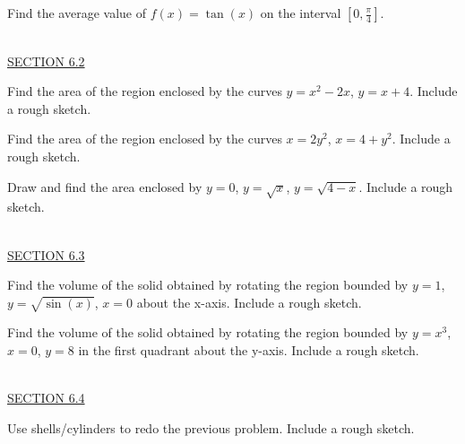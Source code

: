\documentclass{exam}
\begin{document}
\begin{questions}
\question Find the average value of $f(x)=\tan(x)$ on the interval $\left[ 0, \frac{\pi}{4} \right]$.  %



\ \\
\underline{SECTION 6.2}

\question Find the area of the region enclosed by the curves $y=x^2-2x$, $y=x+4$.  Include a rough sketch. %

\question Find the area of the region enclosed by the curves $x=2y^2$, $x=4+y^2$.   Include a rough sketch. %

\question Draw and find the area enclosed by $y=0$, $y=\sqrt{x}$, $y=\sqrt{4-x}$.  Include a rough sketch.  %

\ \\
\underline{SECTION 6.3 }

\question Find the volume of the solid obtained by rotating the region bounded by $y = 1$, $y= \sqrt{\sin(x)}$, $x=0$ about the x-axis.   Include a rough sketch.

\question Find the volume of the solid obtained by rotating the region bounded by $y=x^3$, $x=0$, $y = 8$ in the first quadrant about the y-axis.   Include a rough sketch.

\ \\
\underline{SECTION 6.4 }

\question Use shells/cylinders to redo the previous problem.     Include a rough sketch.


\end{questions}
\end{document}
